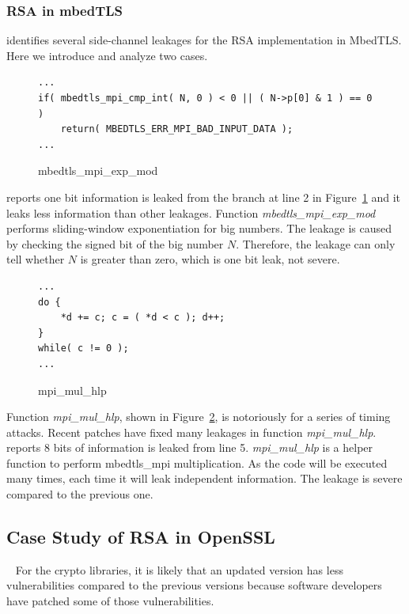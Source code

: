 \subsubsection{RSA in mbedTLS}
\tool{} identifies several side-channel leakages for the RSA implementation
in MbedTLS. Here we introduce and analyze two cases. %

\begin{figure}%
    \centering
    \begin{lstlisting}[xleftmargin=.02\textwidth,xrightmargin=.01\textwidth]
...
if( mbedtls_mpi_cmp_int( N, 0 ) < 0 || ( N->p[0] & 1 ) == 0 )
    return( MBEDTLS_ERR_MPI_BAD_INPUT_DATA );
...
\end{lstlisting}
    \caption{mbedtls\_mpi\_exp\_mod}
    \label{fig:mbedtls_rsa_1}
\end{figure}

\tool{} reports one bit information is leaked from the branch at line 2 in Figure~\ref{fig:mbedtls_rsa_1} and it
leaks less information than other leakages. Function
\emph{mbedtls\_mpi\_exp\_mod} performs sliding-window exponentiation for big
numbers. The leakage is caused by checking the signed bit of the big number $N$.
Therefore, the leakage can only tell whether $N$ is greater than zero, which is
one bit leak, not severe.


\begin{figure}%
    \centering
    \begin{lstlisting}[xleftmargin=.02\textwidth,xrightmargin=.01\textwidth]
...
do {
    *d += c; c = ( *d < c ); d++;
}
while( c != 0 );
...
\end{lstlisting}
    \caption{mpi\_mul\_hlp}
    \label{fig:mbedtls_rsa_2}
\end{figure}

Function \emph{mpi\_mul\_hlp}, shown in Figure~\ref{fig:mbedtls_rsa_2},
is notoriously for a series of timing attacks.
Recent patches have fixed many leakages in function \emph{mpi\_mul\_hlp}.
\tool{} reports 8 bits of information is leaked from line 5.
\emph{mpi\_mul\_hlp} is a helper function to perform mbedtls\_mpi
multiplication. As the code will be executed many times, each time it will leak
independent information. The leakage is severe compared to the previous one.

\subsection{Case Study of RSA in OpenSSL}~\label{sec::eval_rsa}
For the crypto libraries, it is likely that an updated version has less
vulnerabilities compared to the previous versions because software developers
have patched some of those vulnerabilities.

